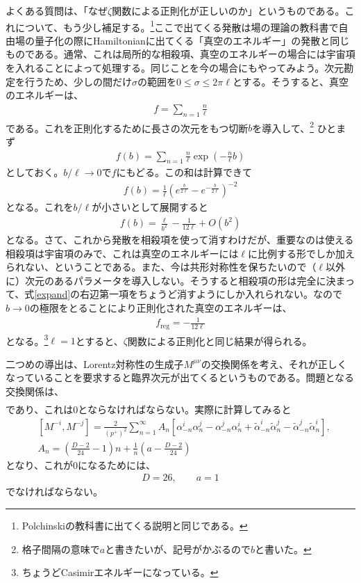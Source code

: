 \documentclass[report,paper=a4, fontsize=12pt, line_length=16cm, number_of_lines=33,dvipdfmx]{jlreq}
\numberwithin{equation}{chapter}
\numberwithin{equation}{section}
\newcommand{\alphat}{\tilde{\alpha}}
\begin{document}
よくある質問は、「なぜ$\zeta$関数による正則化が正しいのか」というものである。これについて、もう少し補足する。\footnote{Polchinskiの教科書に出てくる説明と同じである。}ここで出てくる発散は場の理論の教科書で自由場の量子化の際にHamiltonianに出てくる「真空のエネルギー」の発散と同じものである。通常、これは局所的な相殺項、真空のエネルギーの場合には宇宙項を入れることによって処理する。同じことを今の場合にもやってみよう。次元勘定を行うため、少しの間だけ$\sigma$の範囲を$0\le \sigma \le 2\pi \ell$とする。そうすると、真空のエネルギーは、
\begin{align}
f=\sum_{n=1}\frac{n}{\ell}
\end{align}
である。これを正則化するために長さの次元をもつ切断$b$を導入して、\footnote{格子間隔の意味で$a$と書きたいが、記号がかぶるので$b$と書いた。}
ひとまず
\begin{align}
f(b)=\sum_{n=1}\frac{n}{\ell} \exp\left(-\frac{n}{\ell} b\right)
\end{align}
としておく。$b/\ell \to 0$で$f$にもどる。この和は計算できて
\begin{align}
f(b)=\frac{1}{\ell}(e^{\frac{b}{2\ell}}-e^{-\frac{b}{2\ell}})^{-2}
\end{align}
となる。これを$b/\ell$が小さいとして展開すると
\begin{align}
f(b)=\frac{\ell}{b^2}-\frac{1}{12\ell}+O(b^2)\label{expand}
\end{align}
となる。さて、これから発散を相殺項を使って消すわけだが、重要なのは使える相殺項は宇宙項のみで、これは真空のエネルギーには$\ell$に比例する形でしか加えられない、ということである。また、今は共形対称性を保ちたいので（$\ell$以外に）次元のあるパラメータを導入しない。そうすると相殺項の形は完全に決まって、式\eqref{expand}の右辺第一項をちょうど消すようにしか入れられない。なので$b\to 0$の極限をとることにより正則化された真空のエネルギーは、
\begin{align}
f_{\mathrm{reg}}=-\frac{1}{12\ell}
\end{align}
となる。\footnote{ちょうどCasimirエネルギーになっている。}$\ell=1$とすると、$\zeta$関数による正則化と同じ結果が得られる。

二つめの導出は、Lorentz対称性の生成子$M^{\mu\nu}$の交換関係を考え、それが正しくなっていることを要求すると臨界次元が出てくるというものである。問題となる交換関係は、
\begin{align}
[M^{-i},M^{-j}]
\end{align}
であり、これは$0$とならなければならない。実際に計算してみると
\begin{align}
&[M^{-i},M^{-j}]=\frac{2}{(p^{+})^2}\sum_{n=1}^{\infty}A_{n}
\left[
\alpha_{-n}^i\alpha_{n}^j
-\alpha_{-n}^j\alpha_{n}^i
+\alphat_{-n}^i\alphat_{n}^j
-\alphat_{-n}^j\alphat_{n}^i
\right],\nonumber\\
&A_n=\left(\frac{D-2}{24}-1\right)n+
\frac{1}{n}\left(a-\frac{D-2}{24}\right)
\end{align}
となり、これが$0$になるためには、
\begin{align}
D=26,\qquad a=1
\end{align}
でなければならない。
\end{document}
